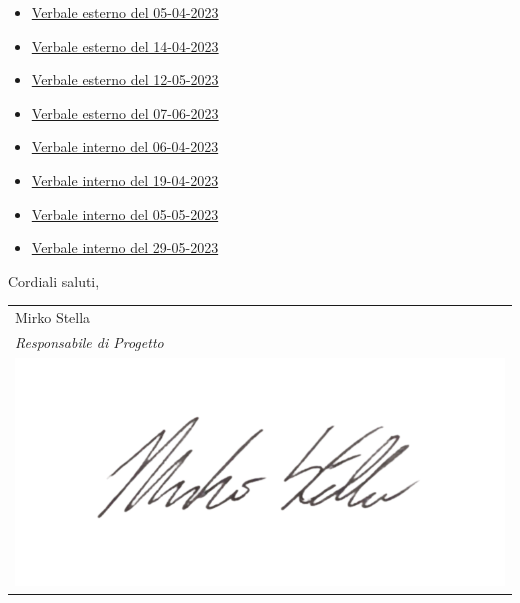 \documentclass[10pt]{article}
\begin{document}
\begin{itemize}
  \item \href{https://github.com/7clickers/Documentazione-7clickers/blob/main/RTB/documentazione_esterna/verbali/VE_2023-02-17.pdf}{Verbale esterno del 05-04-2023}
  \item \href{https://github.com/7clickers/Documentazione-7clickers/blob/main/RTB/documentazione_esterna/verbali/VE_2023-02-17.pdf}{Verbale esterno del 14-04-2023}
  \item \href{https://github.com/7clickers/Documentazione-7clickers/blob/main/RTB/documentazione_esterna/verbali/VE_2023-02-17.pdf}{Verbale esterno del 12-05-2023}
  \item \href{https://github.com/7clickers/Documentazione-7clickers/blob/main/RTB/documentazione_esterna/verbali/VE_2023-02-17.pdf}{Verbale esterno del 07-06-2023}
  \item \href{https://github.com/7clickers/Documentazione-7clickers/blob/main/RTB/documentazione_interna/verbali/VI_2022-10-19.pdf}{Verbale interno del 06-04-2023}
  \item \href{https://github.com/7clickers/Documentazione-7clickers/blob/main/RTB/documentazione_interna/verbali/VI_2022-10-19.pdf}{Verbale interno del 19-04-2023}
  \item \href{https://github.com/7clickers/Documentazione-7clickers/blob/main/RTB/documentazione_interna/verbali/VI_2022-10-19.pdf}{Verbale interno del 05-05-2023}
  \item \href{https://github.com/7clickers/Documentazione-7clickers/blob/main/RTB/documentazione_interna/verbali/VI_2022-10-19.pdf}{Verbale interno del 29-05-2023}
\end{itemize}

Cordiali saluti,

\vspace{15pt}

\hfill
\begin{tabular}{ l @{} }
Mirko Stella\\
\textit{Responsabile di Progetto}\\
\includegraphics[scale=0.2]{images/firma_responsabile.png}
\end{tabular}
\end{document}
